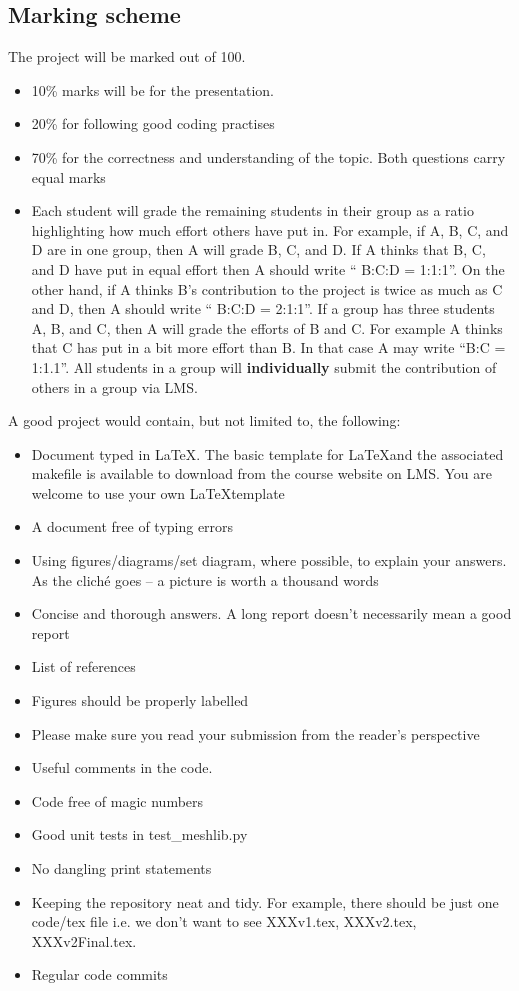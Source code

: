 \documentclass[a4paper, 11pt]{article}
\begin{document}
\subsection{Marking scheme}
The project will be marked out of 100. 
\begin{itemize}
  \item 10\% marks will be for the presentation.
  \item 20\% for following good coding practises
  \item 70\% for the correctness and understanding of the topic. Both questions carry equal marks
  \item Each student will grade the remaining students in their group as a ratio highlighting how much effort others have put in. For example, if A, B, C, and D are in one group, then A will grade B, C, and D. If A thinks that B, C, and D have put in equal effort then A should write `` B:C:D = 1:1:1''. On the other hand, if A thinks B's contribution to the project is twice as much as C and D, then A should write `` B:C:D = 2:1:1''. If a group has three students A, B, and C, then A will grade the efforts of B and C. For example A thinks that C has put in a bit more effort than B. In that case A may write ``B:C = 1:1.1''. All students in a group will \textbf{individually} submit the contribution of others in a group via LMS.
\end{itemize}

A good project would contain, but not limited to, the following:
\begin{itemize}
   \item Document typed in \LaTeX. The basic template for \LaTeX and the associated makefile is available to download from the course website on LMS. You are welcome to use your own \LaTeX template
   \item A document free of typing errors
   \item Using figures/diagrams/set diagram, where possible, to explain your answers. As the clich\'e goes -- a picture is worth a thousand words
   \item Concise and thorough answers. A long report doesn't necessarily mean a good report
   \item List of references
   \item Figures should be properly labelled
   \item Please make sure you read your submission from the reader's perspective 
   \item Useful comments in the code. 
   \item Code free of magic numbers
   \item Good unit tests in test\_meshlib.py
   \item No dangling print statements
   \item Keeping the repository neat and tidy. For example, there should be just one code/tex file i.e. we don't want to see XXXv1.tex, XXXv2.tex, XXXv2Final.tex.
   \item Regular code commits
 \end{itemize}
\end{document}
